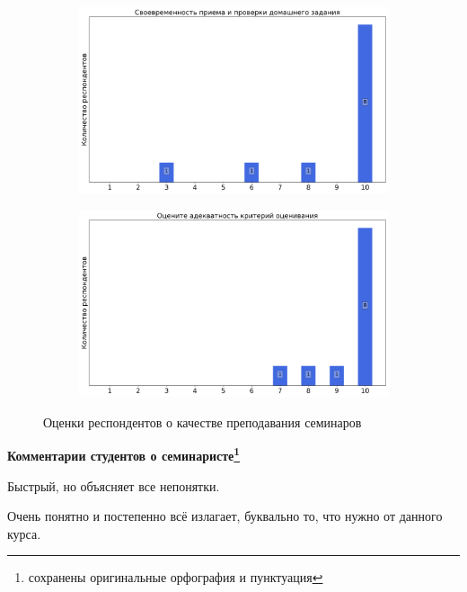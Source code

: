 \begin{figure}[H]
\begin{subfigure}[b]{0.45\textwidth}
                \includegraphics[width=\textwidth]{images/1 course/Дискретный анализ/seminarists-marks-Табунов А.В.-2.png}
            \end{subfigure}
            \begin{subfigure}[b]{0.45\textwidth}
                \centering
                \includegraphics[width=\textwidth]{images/1 course/Дискретный анализ/seminarists-marks-Табунов А.В.-3.png}
            \end{subfigure}	
            \caption{Оценки респондентов о качестве преподавания семинаров}
        \end{figure}

        \textbf{Комментарии студентов о семинаристе\protect\footnote{сохранены оригинальные орфография и пунктуация}}
            \begin{commentbox} 
                Быстрый, но объясняет все непонятки. 
            \end{commentbox} 
        
            \begin{commentbox} 
                Очень понятно и постепенно всё излагает, буквально то, что нужно от данного курса. 
            \end{commentbox}


